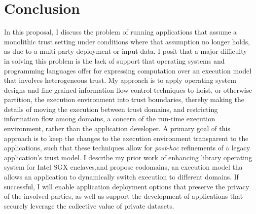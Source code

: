 \section{Conclusion}
\label{sec:conclusion}

In this proposal, I discuss the problem of running applications that
assume a monolithic trust setting under conditions where that assumption no
longer holds, as due to a multi-party deployment or input data.
%
I posit that a major difficulty in solving this problem is the lack of support
that operating systems and programming languages offer for expressing
computation over an execution model that involves heterogeneous trust.
%
My approach is to apply operating system designs and fine-grained information
flow control techniques to hoist, or otherwise partition, the execution
environment into trust boundaries, thereby making the details of moving the
execution between trust domains, and restricting information flow among domains, a
concern of the run-time execution environment, rather than the application
developer.
% 
A primary goal of this approach is to keep the changes to the execution environment
transparent to the applications, such that these techniques allow for
\emph{post-hoc} refinements of a legacy application's trust model.
% 
I describe my prior work of enhancing library operating system for Intel SGX
enclaves,and propose codomains, an execution model tha allows an application to
dynamically switch execution to different domains.
%
If successful, I will enable application deployment options that preserve
the privacy of the involved parties, as well as support the development of
applications that securely leverage the collective value of private datasets.
